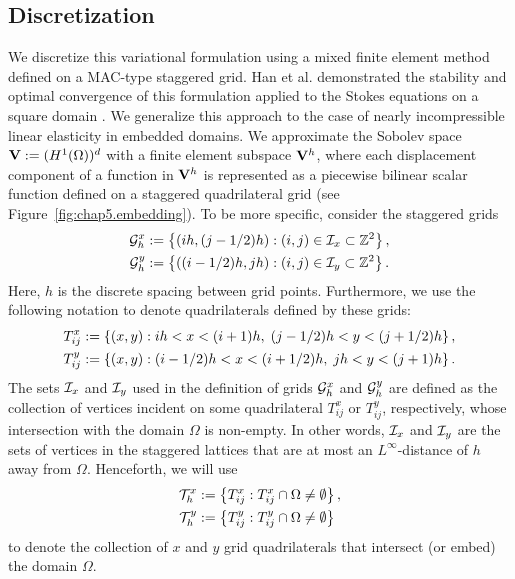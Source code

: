 \subsection{Discretization} \label{subsec:chap5.discretization}

We discretize this variational formulation using a mixed finite element method defined on a MAC-type staggered grid. Han et al. demonstrated the stability and optimal convergence of this formulation applied to the Stokes equations on a square domain \cite{Han.Houde98}. We generalize this approach to the case of nearly incompressible linear elasticity in embedded domains. We approximate the Sobolev space $\mathbf{V} := (H^1(\Omega))^d$ with a finite element subspace $\mathbf{V}^h$, where each displacement component of a function in $\mathbf{V}^h$ is represented as a piecewise bilinear scalar function defined on a staggered quadrilateral grid (see Figure~\ref{fig:chap5.embedding}). To be more specific, consider the staggered grids
\begin{align*}
\mathcal{G}^x_h & := \left\lbrace  (ih, (j-1/2)h) : (i,j) \in \mathcal{I}_x \subset \mathbb{Z}^2  \right\rbrace, \\
\mathcal{G}^y_h & := \left\lbrace  ((i-1/2)h, jh) : (i,j) \in \mathcal{I}_y \subset \mathbb{Z}^2  \right\rbrace.
\end{align*}
Here, $h$ is the discrete spacing between grid points. Furthermore, we use the following notation to denote quadrilaterals defined by these grids:
\begin{align*}
T^x_{ij} & := \left\lbrace  (x,y) : ih < x < (i+1)h, \; (j-1/2)h < y < (j+1/2)h  \right\rbrace, \\
T^y_{ij} & := \left\lbrace  (x,y) : (i-1/2)h < x < (i+1/2)h, \; jh < y < (j+1)h  \right\rbrace.
\end{align*}
The sets $\mathcal{I}_x$ and $\mathcal{I}_y$ used in the definition of grids $\mathcal{G}^x_h$ and $\mathcal{G}^y_h$ are defined as the collection of vertices incident on some quadrilateral $T^x_{ij}$ or $T^y_{ij}$, respectively, whose intersection with the domain $\Omega$ is non-empty. In other words, $\mathcal{I}_x$ and $\mathcal{I}_y$ are the sets of vertices in the staggered lattices that are at most an $L^{\infty}$-distance of $h$ away from $\Omega$. Henceforth, we will use
\begin{align*}
\mathcal{T}^x_h & := \left\lbrace  T^x_{ij} : T^x_{ij} \cap \Omega \neq \emptyset  \right\rbrace, \\
\mathcal{T}^y_h & := \left\lbrace  T^y_{ij} : T^y_{ij} \cap \Omega \neq \emptyset  \right\rbrace
\end{align*}
to denote the collection of $x$ and $y$ grid quadrilaterals that intersect (or embed) the domain $\Omega$.

